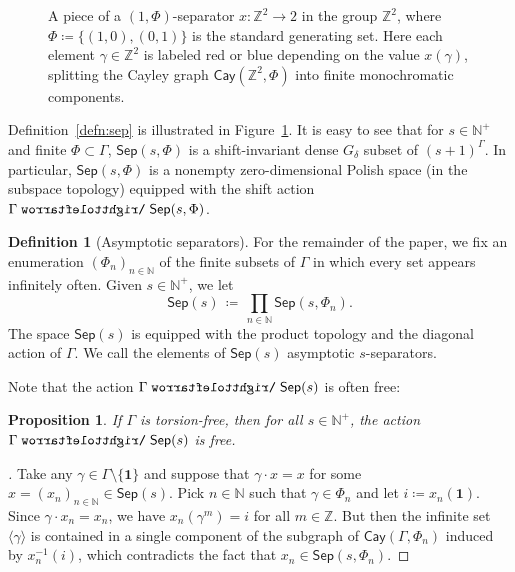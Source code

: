 \documentclass[11pt,reqno,psamsfonts]{amsart}
\theoremstyle{bfnote}
\newtheorem{prop}[theo]{Proposition}
\theoremstyle{definition}
\newtheorem{defn}[theo]{Definition}
\theoremstyle{remark}
\newcommand{\0}{\varnothing}
\newcommand{\set}[1]{\{#1\}}
\newcommand{\defeq}{\coloneqq}
\newcommand{\emphd}[1]{{\fontseries{b}\selectfont\textsf{#1}}}
\newcommand{\acts}{\mathrel{\reflectbox{$\righttoleftarrow$}}}
\newcommand{\G}{\Gamma}
\newcommand{\N}{\mathbb{N}}
\newcommand{\Z}{\mathbb{Z}}
\newcommand{\Cay}{\mathsf{Cay}}
\newcommand{\iden}{\mathbf{1}}
\newcommand{\Sep}{\mathsf{Sep}}
\numberwithin{equation}{section}
\newenvironment{scproof}[1][]{\begin{proof}[\textsc{\upshape{Proof}}#1]}{\end{proof}}
\begin{document}
\begin{figure}[t]
        \caption{A piece of a $(1, \Phi)$-separator $x \colon \Z^2 \to 2$ in the group $\Z^2$, where $\Phi \defeq \set{(1,0),(0,1)}$ is the standard generating set. Here each element $\gamma \in \Z^2$ is labeled red or blue depending on the value $x(\gamma)$, splitting the Cayley graph $\Cay(\Z^2, \Phi)$ into finite monochromatic components.  %
        }\label{fig:separator}
	\end{figure}

    Definition~\ref{defn:sep} is illustrated in Figure~\ref{fig:separator}. It is easy to see that for $s \in \N^+$ and finite $\Phi \subset \G$, $\Sep(s,\Phi)$ is a shift-invariant dense $G_\delta$ subset of $(s+1)^\G$. In particular, $\Sep(s,\Phi)$ is a nonempty zero-dimensional Polish space (in the subspace topology) equipped with the shift action $\G \acts \Sep(s,\Phi)$. 

    \begin{defn}[Asymptotic separators]
    For the remainder of the paper, we fix an enumeration $(\Phi_n)_{n \in \N}$ of the finite subsets of $\G$ in which every set appears infinitely often. Given $s \in \N^+$, we let
    \[
        \Sep(s) \,\defeq\, \prod_{n \in \N} \Sep(s, \Phi_n).
    \]
    The space $\Sep(s)$ is equipped with the product topology and the diagonal action of $\G$. We call the elements of $\Sep(s)$ \emphd{asymptotic $s$-separators}.
    \end{defn}
    
    Note that the action $\G \acts \Sep(s)$ is often free:

    \begin{prop}\label{prop:torsion-free}
        If $\G$ is torsion-free, then for all $s \in \N^+$, the action $\G \acts \Sep(s)$ is free.
    \end{prop}
    \begin{scproof}
        Take any $\gamma \in \G \setminus \set{\iden}$ and suppose that $\gamma \cdot x = x$ for some $x = (x_n)_{n \in \N} \in \Sep(s)$. Pick $n \in \N$ such that $\gamma \in \Phi_n$ and let $i \defeq x_n(\iden)$. Since $\gamma \cdot x_n = x_n$, we have $x_n(\gamma^m) = i$ for all $m \in \Z$. But then the infinite set $\langle \gamma \rangle$ is contained in a single component of the subgraph of $\Cay(\G, \Phi_n)$ induced by $x_n^{-1}(i)$, which contradicts the fact that $x_n \in \Sep(s, \Phi_n)$. %
    \end{scproof}
\end{document}
